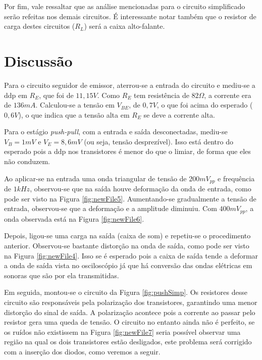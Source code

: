 \documentclass{pack}
\begin{document}
        Por fim, vale ressaltar que as análise mencionadas para o circuito simplificado serão refeitas nos demais circuitos. É interessante notar também que o resistor de carga destes circuitos (\emph{$R_L$}) será a caixa alto-falante.

    \section{Discussão} \label{sec:discussao}
        Para o circuito seguidor de emissor, aterrou-se a entrada do circuito e mediu-se a ddp em $R_E$, que foi de $11,15V$. Como $R_E$ tem resistência de $82\Omega$, a corrente era de $136mA$. Calculou-se a tensão em $V_{BE}$, de $0,7V$, o que foi acima do esperado ($0,6V$), o que indica que a tensão alta em $R_E$ se deve a corrente alta.
        
        Para o estágio \textit{push-pull}, com a entrada e saída desconectadas, mediu-se $V_B = 1mV$ e $V_E = 8,6mV$ (ou seja, tensão desprezível). Isso está dentro do esperado pois a ddp nos transistores é menor do que o limiar, de forma que eles não conduzem.
        
        Ao aplicar-se na entrada uma onda triangular de tensão de $200mV_{pp}$ e frequência de $1kHz$, observou-se que na saída houve deformação da onda de entrada, como pode ser visto na Figura \ref{fig:newFile5}. Aumentando-se gradualmente a tensão de entrada, observou-se que a deformação e a amplitude diminuiu. Com $400mV_{pp}$, a onda observada está na Figura \ref{fig:newFile6}.
        
        Depois, ligou-se uma carga na saída (caixa de som) e repetiu-se o procedimento anterior. Observou-se bastante distorção na onda de saída, como pode ser visto na Figura \ref{fig:newFile4}. Isso se é esperado pois a caixa de saída tende a deformar a onda de saída vista no osciloscópio já que há conversão das ondas elétricas em sonoras que são por ela transmitidas.
        
        Em seguida, montou-se o circuito da Figura \ref{fig:pushSimp}. Os resistores desse circuito são responsáveis pela polarização dos transistores, garantindo uma menor distorção do sinal de saída. A polarização acontece pois a corrente ao passar pelo resistor gera uma queda de tensão. O circuito no entanto ainda não é perfeito, se os ruídos não existissem na Figura \ref{fig:newFile7} seria possível observar uma região na qual os dois transistores estão desligados, este problema será corrigido com a inserção dos diodos, como veremos a seguir.
        
\end{document}
